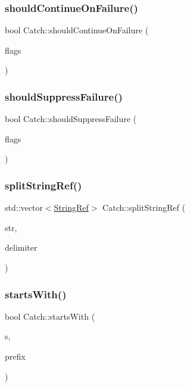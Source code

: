 \subsubsection{\texorpdfstring{shouldContinueOnFailure()}{shouldContinueOnFailure()}}
{\footnotesize\ttfamily bool Catch\+::should\+Continue\+On\+Failure (\begin{DoxyParamCaption}\item[{int}]{flags }\end{DoxyParamCaption})}

\mbox{\label{namespace_catch_ab91eb13081203d634fe48d3d2ab386d7}} 
\subsubsection{\texorpdfstring{shouldSuppressFailure()}{shouldSuppressFailure()}}
{\footnotesize\ttfamily bool Catch\+::should\+Suppress\+Failure (\begin{DoxyParamCaption}\item[{int}]{flags }\end{DoxyParamCaption})}

\mbox{\label{namespace_catch_a35ef4c6329ab86a47243c25a58274109}} 
\subsubsection{\texorpdfstring{splitStringRef()}{splitStringRef()}}
{\footnotesize\ttfamily std\+::vector$<$\mbox{\hyperlink{class_catch_1_1_string_ref}{String\+Ref}}$>$ Catch\+::split\+String\+Ref (\begin{DoxyParamCaption}\item[{\mbox{\hyperlink{class_catch_1_1_string_ref}{String\+Ref}}}]{str,  }\item[{char}]{delimiter }\end{DoxyParamCaption})}

\mbox{\label{namespace_catch_a695f62327be0676e046291eeaae15110}} 
\subsubsection{\texorpdfstring{startsWith()}{startsWith()}\hspace{0.1cm}{\footnotesize\ttfamily [1/2]}}
{\footnotesize\ttfamily bool Catch\+::starts\+With (\begin{DoxyParamCaption}\item[{std\+::string const \&}]{s,  }\item[{std\+::string const \&}]{prefix }\end{DoxyParamCaption})}

